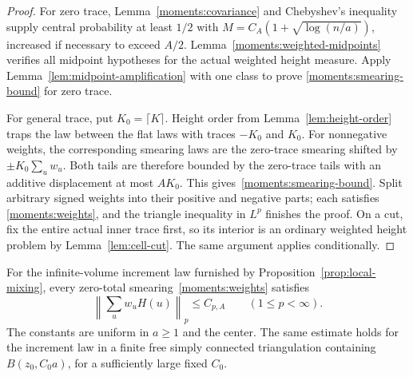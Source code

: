 \begin{proof}
For zero trace, Lemma~\ref{moments:covariance} and Chebyshev's inequality
supply central probability at least $1/2$ with
$M=C_A(1+\sqrt{\log(n/a)})$, increased if necessary to exceed $A/2$.
Lemma~\ref{moments:weighted-midpoints} verifies all midpoint hypotheses
for the actual weighted height measure.  Apply
Lemma~\ref{lem:midpoint-amplification} with one class to prove
\eqref{moments:smearing-bound} for zero trace.

For general trace, put $K_0=\lceil K\rceil$.  Height order from
Lemma~\ref{lem:height-order} traps the law between the flat laws with
traces $-K_0$ and $K_0$.  For nonnegative weights, the corresponding
smearing laws are the zero-trace smearing shifted by
$\pm K_0\sum_uw_u$.  Both tails are therefore bounded by the
zero-trace tails with an additive displacement at most $AK_0$.
This gives~\eqref{moments:smearing-bound}.  Split arbitrary signed
weights into their positive and negative parts; each satisfies
\eqref{moments:weights}, and the triangle inequality in $L^p$ finishes
the proof.  On a cut, fix the entire actual inner trace first, so its
interior is an ordinary weighted height problem by
Lemma~\ref{lem:cell-cut}.  The same argument applies conditionally.
\end{proof}

\begin{proposition}
\label{prop:plane-moments}
For the infinite-volume increment law furnished by
Proposition~\ref{prop:local-mixing}, every zero-total
smearing~\eqref{moments:weights} satisfies
\begin{equation}\label{moments:plane-bound}
 \left\|\sum_uw_uH(u)\right\|_p\leq C_{p,A}
 \qquad(1\leq p<\infty).
\end{equation}
The constants are uniform in $a\geq1$ and the center.  The same estimate
holds for the increment law in a finite free simply connected
triangulation containing $B(z_0,C_0a)$, for a sufficiently large fixed
$C_0$.
\end{proposition}

